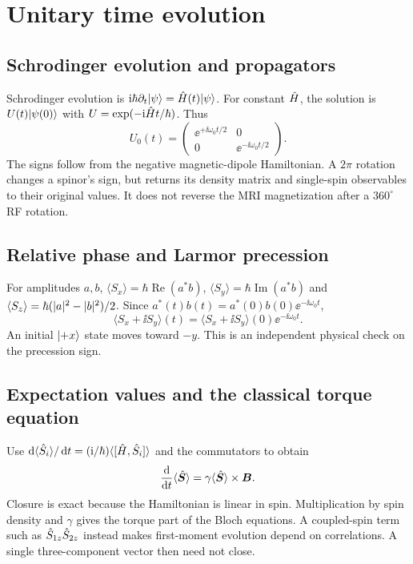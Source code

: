 \section{Unitary time evolution}
\label{sec:02:unitary-time-evolution}
\subsection{Schrodinger evolution and propagators}
Schrodinger evolution is
$\mathrm{i}\hbar\partial_t\lvert \psi\rangle=\hat{H}(t)\lvert \psi\rangle$.
For constant $\hat{H}$, the solution is
$U(t)\lvert \psi(0)\rangle$ with $U=\exp(-\mathrm{i}\hat{H}t/\hbar)$.
Thus
\begin{equation}
 U_0(t)=\begin{pmatrix}
 \ee^{+\ii\omega_0t/2}&0\\0&\ee^{-\ii\omega_0t/2}
 \end{pmatrix}.
 \label{eq:02:free-u}
\end{equation}
The signs follow from the negative magnetic-dipole Hamiltonian.
A $2\pi$ rotation changes a spinor's sign, but returns its density matrix
and single-spin observables to their original values. It does not reverse
the MRI magnetization after a $360^\circ$ RF rotation.

\subsection{Relative phase and Larmor precession}
For amplitudes $a,b$,
$\langle S_x\rangle=\hbar\operatorname{Re}(a^*b)$,
$\langle S_y\rangle=\hbar\operatorname{Im}(a^*b)$ and
$\langle S_z\rangle=\hbar(\lvert a\rvert^2-\lvert b\rvert^2)/2$.
Since $a^*(t)b(t)=a^*(0)b(0)\ee^{-\ii\omega_0t}$,
\begin{equation}
 \langle S_x+\ii S_y\rangle(t)
 =\langle S_x+\ii S_y\rangle(0)\ee^{-\ii\omega_0t}.
 \label{eq:02:coherence}
\end{equation}
An initial $\lvert +x\rangle$ state moves toward $-y$.
This is an independent physical check on the precession sign.

\subsection{Expectation values and the classical torque equation}
Use $\mathop{}\!\mathrm{d}\langle\hat{S}_i\rangle/\mathop{}\!\mathrm{d} t
=(\mathrm{i}/\hbar)\langle[\hat{H},\hat{S}_i]\rangle$ and the commutators to obtain
\begin{equation}
 \frac{\mathop{}\!\mathrm{d}}{\mathop{}\!\mathrm{d} t}\langle\hat{\bm{S}}\rangle
       =\gamma\langle\hat{\bm{S}}\rangle\times\bm{B} .
 \label{eq:02:ehrenfest}
\end{equation}
Closure is exact because the Hamiltonian is linear in spin.
Multiplication by spin density and $\gamma$ gives the torque part of
the Bloch equations. A coupled-spin term such as
$\hat{S}_{1z}\hat{S}_{2z}$ instead makes first-moment evolution depend on
correlations. A single three-component vector then need not close.

